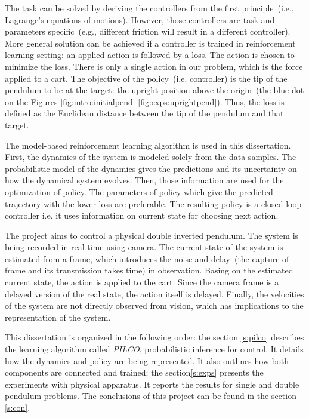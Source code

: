 \noindent The task can be solved by deriving the controllers from the first principle\ (i.e., Lagrange's equations of motions). However, those controllers are task and parameters specific\ (e.g., different friction will result in a different controller). More general solution can be achieved if a controller is trained in reinforcement learning setting: an applied action is followed by a loss. The action is chosen to minimize the loss. There is only a single action in our problem, which is the force applied to a cart. The objective of the policy\ (i.e. controller) is the tip of the pendulum to be at the target: the upright position above the origin\ (the blue dot on the Figures \ref{fig:intro:initialpend}-\ref{fig:exps:uprightpend}). Thus, the loss is defined as the Euclidean distance between the tip of the pendulum and that target. 

\noindent The model-based reinforcement learning algorithm is used in this dissertation. First, the dynamics of the system is modeled solely from the data samples. The probabilistic model of the dynamics gives the predictions and its uncertainty on how the dynamical system evolves. Then, those information are used for the optimization of policy. The parameters of policy which give the predicted trajectory with the lower loss are preferable. The resulting policy is a closed-loop controller i.e. it uses information on current state for choosing next action.

\noindent The project aims to control a physical double inverted pendulum. The system is being recorded in real time using camera. The current state of the system is estimated from a frame, which introduces the noise and delay\ (the capture of frame and its transmission takes time) in observation. Basing on the estimated current state, the action is applied to the cart. Since the camera frame is a delayed version of the real state, the action itself is delayed. Finally, the velocities of the system are not directly observed from vision, which has implications to the representation of the system.

\noindent This dissertation is organized in the following order: the section \ref{s:pilco} describes the learning algorithm called \textit{PILCO}, probabilistic inference for control. It details how the dynamics and policy are being represented. It also outlines how both components are connected and trained; the section\ref{s:exps} presents the experiments with physical apparatus. It reports the results for single and double pendulum problems. The conclusions of this project can be found in the section \ref{s:con}.
